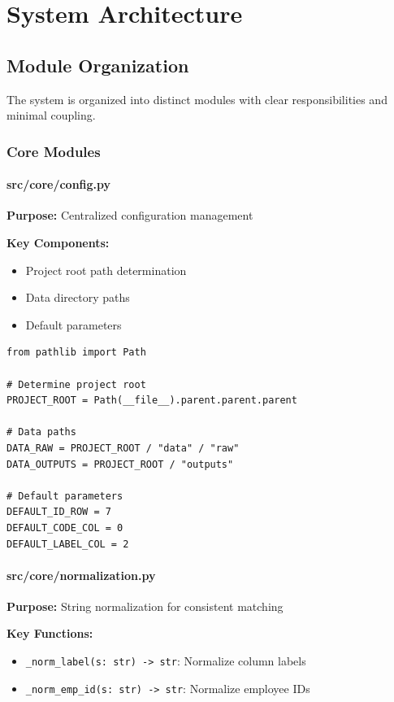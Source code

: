 \chapter{System Architecture}

\section{Module Organization}

The system is organized into distinct modules with clear responsibilities and minimal coupling.

\subsection{Core Modules}

\subsubsection{src/core/config.py}

\textbf{Purpose:} Centralized configuration management

\textbf{Key Components:}
\begin{itemize}
    \item Project root path determination
    \item Data directory paths
    \item Default parameters
\end{itemize}

\begin{lstlisting}[style=pythonstyle, caption=Configuration Module Structure]
from pathlib import Path

# Determine project root
PROJECT_ROOT = Path(__file__).parent.parent.parent

# Data paths
DATA_RAW = PROJECT_ROOT / "data" / "raw"
DATA_OUTPUTS = PROJECT_ROOT / "outputs"

# Default parameters
DEFAULT_ID_ROW = 7
DEFAULT_CODE_COL = 0
DEFAULT_LABEL_COL = 2
\end{lstlisting}

\subsubsection{src/core/normalization.py}

\textbf{Purpose:} String normalization for consistent matching

\textbf{Key Functions:}
\begin{itemize}
    \item \texttt{\_norm\_label(s: str) -> str}: Normalize column labels
    \item \texttt{\_norm\_emp\_id(s: str) -> str}: Normalize employee IDs
\end{itemize}

